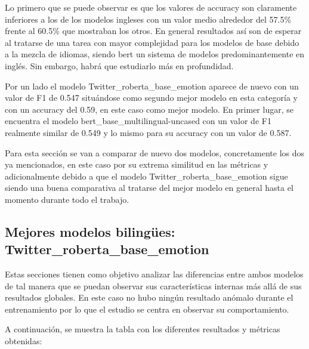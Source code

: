 Lo primero que se puede observar es que los valores de accuracy son claramente inferiores a los de los modelos ingleses con un valor medio alrededor del 57.5\% frente al 60.5\% que mostraban los otros. En general resultados así son de esperar al tratarse de una tarea con mayor complejidad para los modelos de base debido a la mezcla de idiomas, siendo bert un sistema de modelos predominantemente en inglés. Sin embargo, habrá que estudiarlo más en profundidad.

Por un lado el modelo Twitter\_roberta\_base\_emotion aparece de nuevo con un valor de F1  de 0.547 situándose como segundo mejor modelo en esta categoría y con un accuracy del 0.59, en este caso como mejor modelo. En primer lugar, se encuentra el modelo bert\_base\_multilingual-uncased con un valor de F1 realmente similar de 0.549 y lo mismo para su accuracy con un valor de 0.587.

Para esta sección se van a comparar de nuevo dos modelos, concretamente los dos ya mencionados, en este caso por su extrema similitud en las métricas y adicionalmente debido a que el modelo Twitter\_roberta\_base\_emotion sigue siendo una buena comparativa al tratarse del mejor modelo en general hasta el momento durante todo el trabajo.

\subsection{Mejores modelos bilingües: Twitter\_roberta\_base\_emotion}

Estas secciones tienen como objetivo analizar las diferencias entre ambos modelos de tal manera que se puedan observar sus características internas más allá de sus resultados globales. En este caso no hubo ningún resultado anómalo durante el entrenamiento por lo que el estudio se centra en observar su comportamiento.

A continuación, se muestra la tabla con los diferentes resultados y métricas obtenidas:

